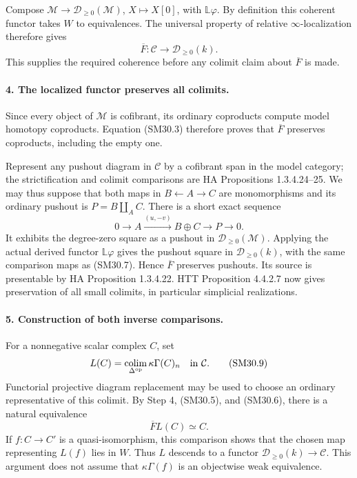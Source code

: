 Compose \(\mathcal M\to\mathcal D_{\ge0}(\mathcal M)\),
\(X\mapsto X[0]\), with \(\mathbb L\varphi\).
By definition this coherent functor takes \(W\) to
equivalences.  The universal property of relative
\(\infty\)-localization therefore gives
\[
 \overline F:\mathcal C\longrightarrow\mathcal D_{\ge0}(k).
                                                               \tag{SM30.7}
\]
This supplies the required coherence before any colimit claim
about \(\overline F\) is made.

\paragraph{4. The localized functor preserves all colimits.}
Since every object of \(\mathcal M\) is cofibrant, its ordinary
coproducts compute model homotopy coproducts.  Equation (SM30.3)
therefore proves that \(\overline F\) preserves coproducts,
including the empty one.

Represent any pushout diagram in \(\mathcal C\) by a
cofibrant span in the model category; the strictification and
colimit comparisons are HA Propositions 1.3.4.24--25.
We may thus suppose that both maps in
\(B\leftarrow A\to C\) are monomorphisms and its ordinary
pushout is \(P=B\amalg_A C\).  There is a short exact sequence
\[
 0\longrightarrow A\xrightarrow{(u,-v)}B\oplus C
                     \longrightarrow P\longrightarrow0.
                                                               \tag{SM30.8}
\]
It exhibits the degree-zero square as a pushout in
\(\mathcal D_{\ge0}(\mathcal M)\).  Applying the actual
derived functor \(\mathbb L\varphi\) gives the pushout
square in \(\mathcal D_{\ge0}(k)\), with the same comparison
maps as (SM30.7).  Hence \(\overline F\) preserves pushouts.
Its source is presentable by HA Proposition 1.3.4.22.
HTT Proposition 4.4.2.7 now gives preservation of all small
colimits, in particular simplicial realizations.

\paragraph{5. Construction of both inverse comparisons.}
For a nonnegative scalar complex \(C\), set
\[
 L(C)=\operatorname*{colim}_{\Delta^{\rm op}}
                        \kappa\Gamma(C)_n\quad\text{in }\mathcal C.
                                                               \tag{SM30.9}
\]
Functorial projective diagram replacement may be used to choose
an ordinary representative of this colimit.  By Step 4,
(SM30.5), and (SM30.6), there is a natural equivalence
\[
                      \overline F L(C)\simeq C.            \tag{SM30.10}
\]
If \(f:C\to C'\) is a quasi-isomorphism, this comparison
shows that the chosen map representing \(L(f)\) lies in \(W\).
Thus \(L\) descends to a functor
\(\mathcal D_{\ge0}(k)\to\mathcal C\).
This argument does not assume that \(\kappa\Gamma(f)\)
is an objectwise weak equivalence.


